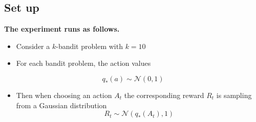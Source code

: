 \documentclass[
  letterpaper,
]{krantz}
\providecommand{\tightlist}{%
  \setlength{\itemsep}{0pt}\setlength{\parskip}{0pt}}\usepackage{longtable,booktabs,array}
\theoremstyle{plain}
\theoremstyle{definition}
\theoremstyle{definition}
\theoremstyle{remark}
\begin{document}
\subsection{Set up}\label{set-up}

\begin{tcolorbox}[enhanced jigsaw, bottomrule=.15mm, opacityback=0, breakable, colframe=quarto-callout-tip-color-frame, left=2mm, rightrule=.15mm, toprule=.15mm, leftrule=.75mm, arc=.35mm, colback=white]
\begin{minipage}[t]{5.5mm}
\textcolor{quarto-callout-tip-color}{\faLightbulb}
\end{minipage}%
\begin{minipage}[t]{\textwidth - 5.5mm}

\vspace{-3mm}\textbf{The experiment runs as follows.}\vspace{3mm}

\begin{itemize}
\item
  Consider a \(k\)-bandit problem with \(k=10\)
\item
  For each bandit problem, the action values
\end{itemize}

\[
  q_{*}(a) \sim \mathcal{N}(0,1)
\]

\begin{itemize}
\tightlist
\item
  Then when choosing an action \(A_t\) the corresponding reward \(R_t\)
  is sampling from a Gaussian distribution \[
  R_t \sim \mathcal{N}(q_{*}(A_t), 1)  
  \]
\end{itemize}

\end{minipage}%
\end{tcolorbox}
\end{document}
